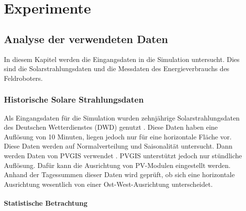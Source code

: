 \clearpage
\section{Experimente}

\subsection{Analyse der verwendeten Daten}
In diesem Kapitel werden die Eingangsdaten in die Simulation untersucht. Dies sind die Solarstrahlungsdaten und die Messdaten des Energieverbrauchs des Feldroboters.

\subsubsection{Historische Solare Strahlungsdaten} \label{strahlung}
Als Eingangsdaten für die Simulation wurden zehnjährige Solarstrahlungsdaten des Deutschen Wetterdienstes (DWD) genutzt \cite{DWD2024Solar10min}. Diese Daten haben eine Auflösung von 10 Minuten, liegen jedoch nur für eine horizontale Fläche vor. Diese Daten werden auf Normalverteilung und Saisonalität untersucht. Dann werden Daten von PVGIS verwendet \cite{PVGIS}. PVGIS unterstützt jedoch nur stündliche Auflösung. Dafür kann die Ausrichtung von PV-Modulen eingestellt werden. Anhand der Tagessummen dieser Daten wird geprüft, ob sich eine horizontale Ausrichtung wesentlich von einer Ost-West-Ausrichtung unterscheidet.
\paragraph{Statistische Betrachtung} \label{stats}


